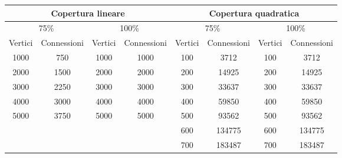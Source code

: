 \begin{table}[!h]
      \begin{adjustbox}{center}
            \begin{tabular}{|c|c|c|c|c|c|c|c|}
                  \hline
                  \multicolumn{4}{c|}{Copertura lineare} & \multicolumn{4}{c}{Copertura quadratica}                                                                                                          \\ \hline
                  \multicolumn{2}{|c|}{75\%}             & \multicolumn{2}{c|}{100\%}               & \multicolumn{2}{c|}{75\%} & \multicolumn{2}{c|}{100\%}                                                 \\ \hline
                  Vertici                                & Connessioni                              & Vertici                   & Connessioni                & Vertici & Connessioni & Vertici & Connessioni \\ \hline
                  1000                                   & 750                                      & 1000                      & 1000                       & 100     & 3712        & 100     & 3712        \\ \hline
                  2000                                   & 1500                                     & 2000                      & 2000                       & 200     & 14925       & 200     & 14925       \\ \hline
                  3000                                   & 2250                                     & 3000                      & 3000                       & 300     & 33637       & 300     & 33637       \\ \hline
                  4000                                   & 3000                                     & 4000                      & 4000                       & 400     & 59850       & 400     & 59850       \\ \hline
                  5000                                   & 3750                                     & 5000                      & 5000                       & 500     & 93562       & 500     & 93562       \\ \hline
                                                         &                                          &                           &                            & 600     & 134775      & 600     & 134775      \\ \hline
                                                         &                                          &                           &                            & 700     & 183487      & 700     & 183487      \\ \hline

\end{tabular}
\end{adjustbox}
\end{table}
